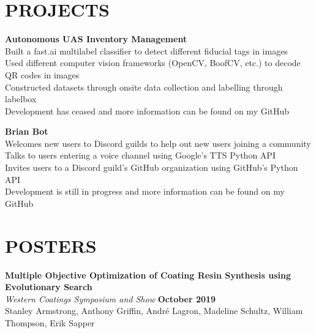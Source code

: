 \documentclass[margin,line]{resume}
\begin{document}
\begin{resume}
\sectionline

    \section{\mysidestyle \textbf{\large{P}\small{ROJECTS}}}
    \textbf{\listing Autonomous UAS Inventory Management} \vspace{2mm}\\\vspace{1mm}%
    Built a fast.ai multilabel classifier to detect different fiducial tags in images \\
    Used different computer vision frameworks (OpenCV, BoofCV, etc.) to decode QR codes in images \\
    Constructed datasets through onsite data collection and labelling through labelbox \\
    Development has ceased and more information can be found on my GitHub

    \textbf{\listing Brian Bot} \vspace{2mm}\\\vspace{1mm}%
        Welcomes new users to Discord guilds to help out new users joining a community \\
        Talks to users entering a voice channel using Google's TTS Python API \\
        Invites users to a Discord guild's GitHub organization using GitHub's Python API \\
        Development is still in progress and more information can be found on my GitHub 
    

\sectionline
    \section{\mysidestyle \textbf{\large{P}\small{OSTERS}}}
    \textbf{\listing Multiple Objective Optimization of Coating Resin Synthesis using\\ Evolutionary Search}\\
    \textsl{Western Coatings Symposium and Show} \hfill \textbf{October 2019}\\
    Stanley Armstrong, Anthony Griffin, Andr\'e Lagron, Madeline Schultz, William Thompson, Erik Sapper




\end{resume}
\end{document}
